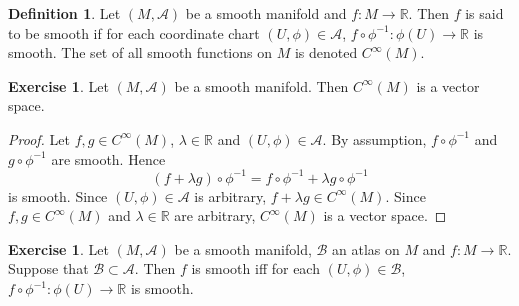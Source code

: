 \documentclass{book}
\theoremstyle{definition}
\newtheorem{defn}[definition]{Definition}
\newtheorem{ex}[definition]{Exercise}
\newcommand{\lam}{\lambda}
\newcommand{\R}{\mathbb{R}}
\newcommand{\MA}{\mathcal{A}}
\newcommand{\MB}{\mathcal{B}}
\newcommand{\ld}[1]{\label{defn:#1}}
\DeclareMathOperator*{\0}{\mbf{0}}
\DeclareMathOperator*{\1}{\mbf{1}}
\begin{document}
	\begin{defn} \ld{42001}
		Let $(M, \MA)$ be a smooth manifold and $f: M \rightarrow \R$. Then $f$ is said to be smooth if for each coordinate chart $(U, \phi) \in \MA$, $f \circ \phi^{-1}: \phi(U) \rightarrow \R$ is smooth. The set of all smooth functions on $M$ is denoted $C^{\infty}(M)$. 
	\end{defn}

	\begin{ex} \ld{42002}
		Let $(M, \MA)$ be a smooth manifold. Then $C^{\infty}(M)$ is a vector space.
	\end{ex}

	\begin{proof}
		Let $f,g \in C^{\infty}(M)$, $\lam \in \R$ and $(U, \phi) \in \MA$. By assumption, $f \circ \phi^{-1}$ and $g \circ \phi^{-1}$ are smooth. Hence 
		$$(f + \lam g) \circ \phi^{-1} = f \circ \phi^{-1} + \lam g \circ \phi^{-1} $$
		is smooth. Since $(U, \phi) \in \MA$ is arbitrary, $f + \lam g \in C^{\infty}(M)$. Since $f,g \in C^{\infty}(M)$ and $\lam \in \R$ are arbitrary, $C^{\infty}(M)$ is a vector space.
	\end{proof}

	\begin{ex}
		Let $(M, \MA)$ be a smooth manifold, $\MB$ an atlas on $M$ and $f:M \rightarrow \R$. Suppose that $\MB \subset \MA$. Then $f$ is smooth iff for each $(U, \phi) \in \MB$, $f \circ \phi^{-1}: \phi(U) \rightarrow \R$ is smooth.
	\end{ex}
\end{document}
